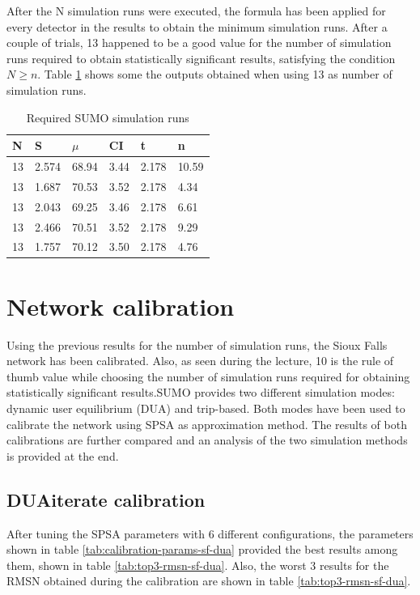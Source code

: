 

After the N simulation runs were executed, the formula has been applied for every detector in the results to obtain the minimum simulation runs. After a couple of trials, 13 happened to be a good value for the number of simulation runs required to obtain statistically significant results, satisfying the condition \(N \geq n\). Table \ref{tab:simulation-runs} shows some the outputs obtained when using 13 as number of simulation runs.

\begin{table}[htpb]
  \centering
  \begin{tabular}{l l l l l l}
    \toprule
      N & S & $\mu$ & CI & t & n \\
    \midrule
      13 & 2.574 & 68.94 & 3.44 & 2.178 & 10.59  \\
      13 & 1.687 & 70.53 & 3.52 & 2.178 & 4.34  \\
      13 & 2.043 & 69.25 & 3.46 & 2.178 & 6.61  \\
      13 & 2.466 & 70.51 & 3.52 & 2.178 & 9.29  \\
      13 & 1.757 & 70.12 & 3.50 & 2.178 & 4.76  \\
    \bottomrule
  \end{tabular}
  \caption[Minimum SUMO Simulation Runs]{Required SUMO simulation runs}
  \label{tab:simulation-runs}
\end{table}

\section{Network calibration}
Using the previous results for the number of simulation runs, the Sioux Falls network has been calibrated. Also, as seen during the lecture, 10 is the rule of thumb value while choosing the number of simulation runs required for obtaining statistically significant results.SUMO provides two different simulation modes: dynamic user equilibrium (DUA) and trip-based. Both modes have been used to calibrate the network using SPSA as approximation method. The results of both calibrations are further compared and an analysis of the two simulation methods is provided at the end. 

\subsection{DUAiterate calibration}
After tuning the SPSA parameters with 6 different configurations, the parameters shown in table \ref{tab:calibration-params-sf-dua} provided the best results among them, shown in table \ref{tab:top3-rmsn-sf-dua}. Also, the worst 3 results for the RMSN obtained during the calibration are shown in table \ref{tab:top3-rmsn-sf-dua}.

